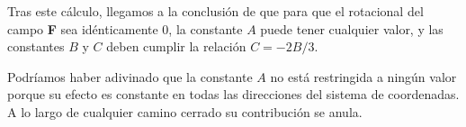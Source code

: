 Tras este cálculo, llegamos a la conclusión de que para que el rotacional del campo \textbf{F} sea idénticamente 0,
la constante $A$ puede tener cualquier valor,
y las constantes $B$ y $C$ deben cumplir la relación $C = -2 B / 3$.

Podríamos haber adivinado que la constante $A$ no está restringida a ningún valor porque su efecto es constante en todas
las direcciones del sistema de coordenadas. A lo largo de cualquier camino cerrado su contribución se anula.






